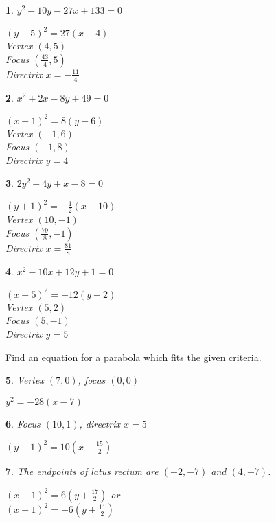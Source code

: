 \documentclass{amsbook}
\newtheorem{exc}{}
\newenvironment{ex}{\begin{exc}\normalfont}{\end{exc}}
\numberwithin{section}{chapter}
\numberwithin{equation}{chapter}
\begin{document}
\begin{multicols}{2}
\begin{ex}
	$y^{2} - 10y - 27x + 133 = 0$
	\begin{sol}
		$(y - 5)^{2} = 27(x - 4)$\\
		Vertex $(4, 5)$\\
		Focus $\left( \frac{43}{4}, 5 \right)$\\
		Directrix $x = -\frac{11}{4}$
	\end{sol}
\end{ex}
\begin{ex}
	$x^2 + 2x - 8y + 49 = 0$
	\begin{sol}
		$(x+1)^2=8(y-6)$ \\
		Vertex $(-1,6)$\\
		Focus $(-1,8)$ \\
		Directrix $y=4$
	\end{sol}
\end{ex}
\begin{ex}
	$2y^2 + 4y +x - 8 = 0$
	\begin{sol}
		$(y+1)^2=-\frac{1}{2}(x-10)$\\
		Vertex $(10,-1)$\\
		Focus $\left(\frac{79}{8}, -1 \right)$\\
		Directrix $x = \frac{81}{8}$
	\end{sol}
\end{ex}
\begin{ex}
	$x^2-10x+12y+1=0$
	\begin{sol}
		$(x-5)^2 = -12(y-2)$\\
		Vertex $(5,2)$\\
		Focus $(5,-1)$ \\
		Directrix $y=5$
	\end{sol}
\end{ex}
\end{multicols}

Find an equation for a parabola which fits the given criteria.

\begin{multicols}{2}
	\begin{ex}
		Vertex $(7, 0)$, focus $(0, 0)$ 
		\begin{sol}
			$y^{2} = -28(x - 7)$
		\end{sol}
	\end{ex}
	\begin{ex}
	Focus $(10, 1)$, directrix $x = 5$
	\begin{sol}
		$(y - 1)^{2} = 10\left(x - \frac{15}{2} \right)$
	\end{sol}
\end{ex}

	\begin{ex}
	The endpoints of latus rectum are $(-2, -7)$ and $(4, -7)$.
	\begin{sol}
		 $(x - 1)^{2} = 6\left(y + \frac{17}{2}\right)$ or\\
		$(x - 1)^{2} = -6\left(y + \frac{11}{2}\right)$
	\end{sol}
\end{ex}
\end{multicols}
\end{document}
